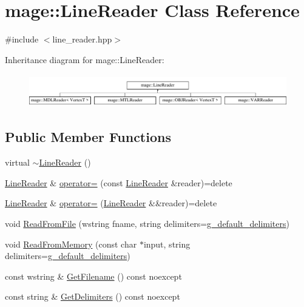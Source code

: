 \hypertarget{classmage_1_1_line_reader}{}\section{mage\+:\+:Line\+Reader Class Reference}
\label{classmage_1_1_line_reader}


{\ttfamily \#include $<$line\+\_\+reader.\+hpp$>$}

Inheritance diagram for mage\+:\+:Line\+Reader\+:\begin{figure}[H]
\begin{center}
\leavevmode
\includegraphics[height=1.458333cm]{classmage_1_1_line_reader}
\end{center}
\end{figure}
\subsection*{Public Member Functions}
\begin{DoxyCompactItemize}
\item 
virtual \hyperlink{classmage_1_1_line_reader_ad9753ea392ebe5b3867852d3392fb1e7}{$\sim$\+Line\+Reader} ()
\item 
\hyperlink{classmage_1_1_line_reader}{Line\+Reader} \& \hyperlink{classmage_1_1_line_reader_a2247078d0b5602f9a9a6b74019832faf}{operator=} (const \hyperlink{classmage_1_1_line_reader}{Line\+Reader} \&reader)=delete
\item 
\hyperlink{classmage_1_1_line_reader}{Line\+Reader} \& \hyperlink{classmage_1_1_line_reader_a45504c0ba4238eedf851cfb9df081a01}{operator=} (\hyperlink{classmage_1_1_line_reader}{Line\+Reader} \&\&reader)=delete
\item 
void \hyperlink{classmage_1_1_line_reader_a6ee0c53351656ac4cd92db1d7c372cff}{Read\+From\+File} (wstring fname, string delimiters=\hyperlink{namespacemage_a10fe126e627cc2ce8af2cc39cc5db81e}{g\+\_\+default\+\_\+delimiters})
\item 
void \hyperlink{classmage_1_1_line_reader_a35ceefa0efd4ccfc3c1401715c0934de}{Read\+From\+Memory} (const char $\ast$input, string delimiters=\hyperlink{namespacemage_a10fe126e627cc2ce8af2cc39cc5db81e}{g\+\_\+default\+\_\+delimiters})
\item 
const wstring \& \hyperlink{classmage_1_1_line_reader_a682ed8030c99a62d4409a01f9efa6d6b}{Get\+Filename} () const noexcept
\item 
const string \& \hyperlink{classmage_1_1_line_reader_aa00e1e27b614e11ec9f70e52d0bac551}{Get\+Delimiters} () const noexcept
\end{DoxyCompactItemize}
